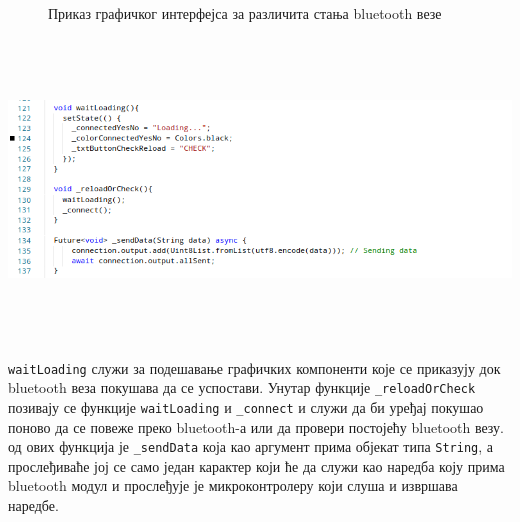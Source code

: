 \documentclass[12pt]{article}
\begin{document}
\begin{figure}[H]
\centering
{}
\hfill %
\hfill %
\caption{Приказ графичког интерфејса за различита стања bluetooth везе}
\end{figure}
\begin{center}
    \centering 
    \includegraphics[height=8cm, width=18cm]{images/dart6}
\end{center}
\indent{} \texttt{waitLoading} служи за подешавање графичких компоненти које се приказују док bluetooth веза покушава да се успостави. Унутар функције \texttt{\_reloadOrCheck} позивају се функције \texttt{waitLoading} и \texttt{\_connect} и служи да би уређај покушао поново да се повеже преко bluetooth-а или да провери постојећу bluetooth везу.\\
 од ових функција је \texttt{\_sendData} која као аргумент прима објекат типа \texttt{String}, а прослеђиваће јој се само један карактер који ће да служи као наредба коју прима bluetooth модул и прослеђује је микроконтролеру који слуша и извршава наредбе.
\end{document}
